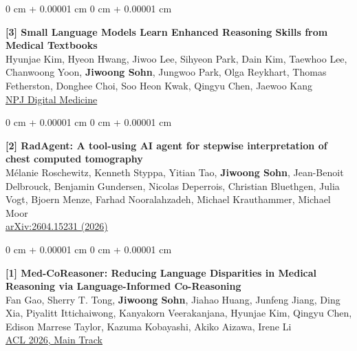 \documentclass[11pt, letterpaper]{article}
\newenvironment{onecolentry}{
    \Needspace{3\baselineskip}
    \begin{adjustwidth}{
        0 cm + 0.00001 cm
    }{
        0 cm + 0.00001 cm
    }
}{
    \end{adjustwidth}
} %
\begin{document}
\begin{onecolentry}
    \textbf{[3] Small Language Models Learn Enhanced Reasoning Skills from Medical Textbooks} \\
    Hyunjae Kim, Hyeon Hwang, Jiwoo Lee, Sihyeon Park, Dain Kim, Taewhoo Lee, Chanwoong Yoon, \textbf{Jiwoong Sohn}, Jungwoo Park, Olga Reykhart, Thomas Fetherston, Donghee Choi, Soo Heon Kwak, Qingyu Chen, Jaewoo Kang \\
    \href{https://arxiv.org/abs/2404.00376} {NPJ Digital Medicine}
\end{onecolentry}
\vspace{0.3 cm}


\begin{onecolentry}
    \textbf{[2] RadAgent: A tool-using AI agent for stepwise interpretation of chest computed tomography} \\
    Mélanie Roschewitz, Kenneth Styppa, Yitian Tao, \textbf{Jiwoong Sohn}, Jean-Benoit Delbrouck, Benjamin Gundersen, Nicolas Deperrois, Christian Bluethgen, Julia Vogt, Bjoern Menze, Farhad Nooralahzadeh, Michael Krauthammer, Michael Moor \\
    \href{https://arxiv.org/abs/2604.15231}{{arXiv:2604.15231 (2026)}} \\
\end{onecolentry}
\vspace{0.3 cm}

\begin{onecolentry}
    \textbf{[1] Med-CoReasoner: Reducing Language Disparities in Medical Reasoning via Language-Informed Co-Reasoning} \\
    Fan Gao, Sherry T. Tong, \textbf{Jiwoong Sohn}, Jiahao Huang, Junfeng Jiang, Ding Xia, Piyalitt Ittichaiwong, Kanyakorn Veerakanjana, Hyunjae Kim, Qingyu Chen, Edison Marrese Taylor, Kazuma Kobayashi, Akiko Aizawa, Irene Li \\
    \href{https://arxiv.org/abs/2601.08267}{{ACL 2026, Main Track}} \\
\end{onecolentry}
\vspace{0.3 cm}
\end{document}
